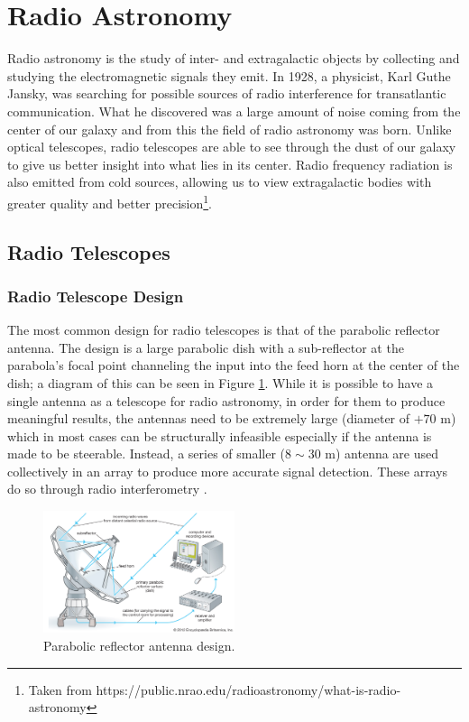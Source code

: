 \section{Radio Astronomy}\label{ra}
Radio astronomy is the study of inter- and extragalactic objects by collecting and studying the electromagnetic signals they emit. In 1928, a physicist, Karl Guthe Jansky, was searching for possible sources of radio interference for transatlantic communication. What he discovered was a large amount of noise coming from the center of our galaxy and from this the field of radio astronomy was born. Unlike optical telescopes, radio telescopes are able to see through the dust of our galaxy to give us better insight into what lies in its center. Radio frequency radiation is also emitted from cold sources, allowing us to view extragalactic bodies with greater quality and better precision\footnote{Taken from https://public.nrao.edu/radioastronomy/what-is-radio-astronomy}.
\subsection{Radio Telescopes}\label{ra:sec:rt}
%
\subsubsection{Radio Telescope Design}
The most common design for radio telescopes is that of the parabolic reflector antenna. The design is a large parabolic dish with a sub-reflector at the parabola's focal point channeling the input into the feed horn at the center of the dish; a diagram of this can be seen in Figure \ref{ra:fig:para}. While it is possible to have a single antenna as a telescope for radio astronomy, in order for them to produce meaningful results, the antennas need to be extremely large (diameter of $+70$ m) which in most cases can be structurally infeasible especially if the antenna is made to be steerable. Instead, a series of smaller ($8\sim30$ m) antenna are used collectively in an array to produce more accurate signal detection. These arrays do so through radio interferometry \citep{cheng2009radio}.
%
\begin{figure}[H]
	\centering
	\includegraphics[width=0.5\textwidth]{Images/Telescope.jpg}
	\caption[]{Parabolic reflector antenna design\footnotemark.}
	\label{ra:fig:para}
\end{figure}
%
